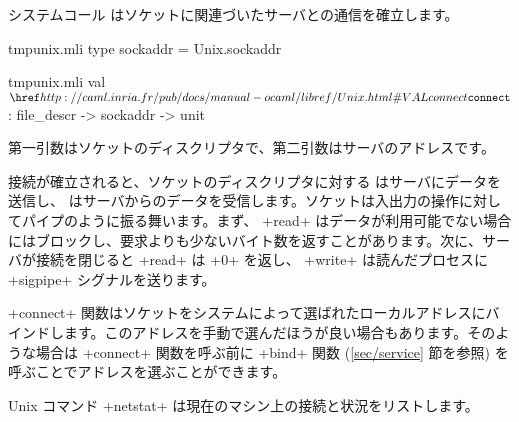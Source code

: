 システムコール  はソケットに関連づいたサーバとの通信を確立します。
%
\begin{codefile}{tmpunix.mli}
type sockaddr = Unix.sockaddr
\end{codefile}
%
\begin{listingcodefile}{tmpunix.mli}
val $\libvalue{Unix}{connect}$ : file_descr -> sockaddr -> unit
\end{listingcodefile}
%
第一引数はソケットのディスクリプタで、第二引数はサーバのアドレスです。

接続が確立されると、ソケットのディスクリプタに対する  はサーバにデータを送信し、 はサーバからのデータを受信します。ソケットは入出力の操作に対してパイプのように振る舞います。まず、 \ml+read+ はデータが利用可能でない場合にはブロックし、要求よりも少ないバイト数を返すことがあります。次に、サーバが接続を閉じると \ml+read+ は \ml+0+ を返し、 \ml+write+ は読んだプロセスに \ml+sigpipe+ シグナルを送ります。

\ml+connect+ 関数はソケットをシステムによって選ばれたローカルアドレスにバインドします。このアドレスを手動で選んだほうが良い場合もあります。そのような場合は \ml+connect+ 関数を呼ぶ前に \ml+bind+ 関数 (\ref{sec/service} 節を参照) を呼ぶことでアドレスを選ぶことができます。

Unix コマンド \ml+netstat+ は現在のマシン上の接続と状況をリストします。


